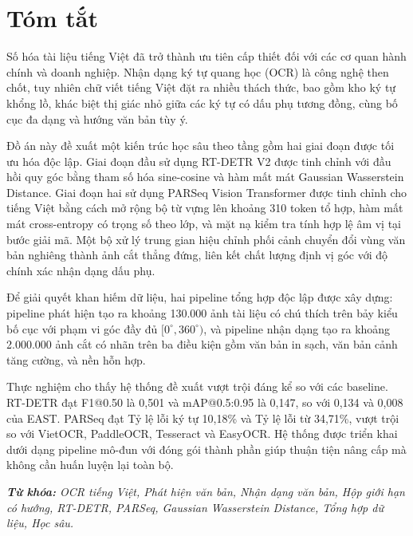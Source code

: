 \chapter*{Tóm tắt}
Số hóa tài liệu tiếng Việt đã trở thành ưu tiên cấp thiết đối với các cơ quan hành chính và doanh nghiệp. Nhận dạng ký tự quang học (OCR) là công nghệ then chốt, tuy nhiên chữ viết tiếng Việt đặt ra nhiều thách thức, bao gồm kho ký tự khổng lồ, khác biệt thị giác nhỏ giữa các ký tự có dấu phụ tương đồng, cùng bố cục đa dạng và hướng văn bản tùy ý.

Đồ án này đề xuất một kiến trúc học sâu theo tầng gồm hai giai đoạn được tối ưu hóa độc lập. Giai đoạn đầu sử dụng RT-DETR V2 được tinh chỉnh với đầu hồi quy góc bằng tham số hóa sine-cosine và hàm mất mát Gaussian Wasserstein Distance. Giai đoạn hai sử dụng PARSeq Vision Transformer được tinh chỉnh cho tiếng Việt bằng cách mở rộng bộ từ vựng lên khoảng 310 token tổ hợp, hàm mất mát cross-entropy có trọng số theo lớp, và mặt nạ kiểm tra tính hợp lệ âm vị tại bước giải mã. Một bộ xử lý trung gian hiệu chỉnh phối cảnh chuyển đổi vùng văn bản nghiêng thành ảnh cắt thẳng đứng, liên kết chất lượng định vị góc với độ chính xác nhận dạng dấu phụ.

Để giải quyết khan hiếm dữ liệu, hai pipeline tổng hợp độc lập được xây dựng: pipeline phát hiện tạo ra khoảng 130.000 ảnh tài liệu có chú thích trên bảy kiểu bố cục với phạm vi góc đầy đủ $[0^\circ, 360^\circ)$, và pipeline nhận dạng tạo ra khoảng 2.000.000 ảnh cắt có nhãn trên ba điều kiện gồm văn bản in sạch, văn bản cảnh tăng cường, và nền hỗn hợp.

Thực nghiệm cho thấy hệ thống đề xuất vượt trội đáng kể so với các baseline. RT-DETR đạt F1@0.50 là 0,501 và mAP@0.5:0.95 là 0,147, so với 0,134 và 0,008 của EAST. PARSeq đạt Tỷ lệ lỗi ký tự 10,18\% và Tỷ lệ lỗi từ 34,71\%, vượt trội so với VietOCR, PaddleOCR, Tesseract và EasyOCR. Hệ thống được triển khai dưới dạng pipeline mô-đun với đóng gói thành phần giúp thuận tiện nâng cấp mà không cần huấn luyện lại toàn bộ.
\vspace{-0.5cm}
\begin{flushleft}
    \textit{\textbf{Từ khóa:} OCR tiếng Việt, Phát hiện văn bản, Nhận dạng văn bản, Hộp giới hạn có hướng, RT-DETR, PARSeq, Gaussian Wasserstein Distance, Tổng hợp dữ liệu, Học sâu.}
\end{flushleft}
\changefontsizes[16pt]{13pt}
